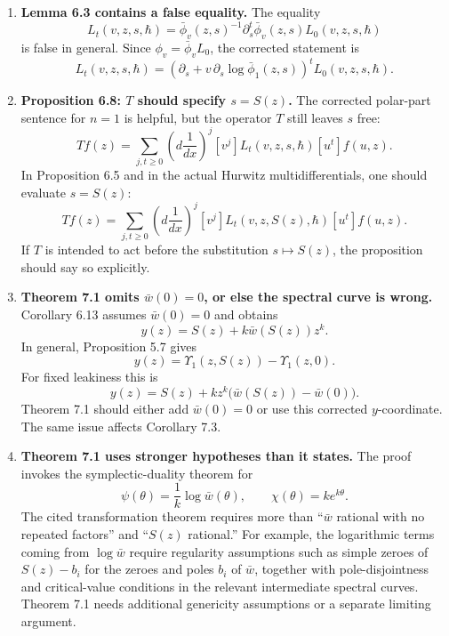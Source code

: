 \documentclass[11pt]{article}
\begin{document}
\begin{enumerate}[label=\textbf{\arabic*.}]
   \item \textbf{Lemma 6.3 contains a false equality.}
   The equality
   \[
      L_t(v,z,s,\hbar)
      =
      \bar\phi_v(z,s)^{-1}\partial_s^t\bar\phi_v(z,s)L_0(v,z,s,\hbar)
   \]
   is false in general.  Since $\phi_v=\bar\phi_v L_0$, the corrected statement is
   \[
      L_t(v,z,s,\hbar)
      =
      \left(
      \partial_s
      +
      v\,\partial_s\log\bar\phi_1(z,s)
      \right)^t
      L_0(v,z,s,\hbar).
   \]

   \item \textbf{Proposition 6.8: $T$ should specify $s=S(z)$.}
   The corrected polar-part sentence for $n=1$ is helpful, but the operator $T$ still leaves $s$ free:
   \[
      Tf(z)
      =
      \sum_{j,t\ge0}
      \left(d\frac1{dx}\right)^j
      [v^j]L_t(v,z,s,\hbar)[u^t]f(u,z).
   \]
   In Proposition 6.5 and in the actual Hurwitz multidifferentials, one should evaluate $s=S(z)$:
   \[
      Tf(z)
      =
      \sum_{j,t\ge0}
      \left(d\frac1{dx}\right)^j
      [v^j]L_t(v,z,S(z),\hbar)[u^t]f(u,z).
   \]
   If $T$ is intended to act before the substitution $s\mapsto S(z)$, the proposition should say so explicitly.

   \item \textbf{Theorem 7.1 omits $\bar w(0)=0$, or else the spectral curve is wrong.}
   Corollary 6.13 assumes $\bar w(0)=0$ and obtains
   \[
      y(z)=S(z)+k\bar w(S(z))z^k.
   \]
   In general, Proposition 5.7 gives
   \[
      y(z)=\Upsilon_1(z,S(z))-\Upsilon_1(z,0).
   \]
   For fixed leakiness this is
   \[
      y(z)
      =
      S(z)+kz^k\bigl(\bar w(S(z))-\bar w(0)\bigr).
   \]
   Theorem 7.1 should either add $\bar w(0)=0$ or use this corrected $y$-coordinate.  The same issue affects Corollary 7.3.

   \item \textbf{Theorem 7.1 uses stronger hypotheses than it states.}
   The proof invokes the symplectic-duality theorem for
   \[
      \psi(\theta)=\frac1k\log\bar w(\theta),
      \qquad
      \chi(\theta)=ke^{k\theta}.
   \]
   The cited transformation theorem requires more than ``$\bar w$ rational with no repeated factors'' and ``$S(z)$ rational.''  For example, the logarithmic terms coming from $\log\bar w$ require regularity assumptions such as simple zeroes of $S(z)-b_i$ for the zeroes and poles $b_i$ of $\bar w$, together with pole-disjointness and critical-value conditions in the relevant intermediate spectral curves.  Theorem 7.1 needs additional genericity assumptions or a separate limiting argument.


\end{enumerate}
\end{document}
